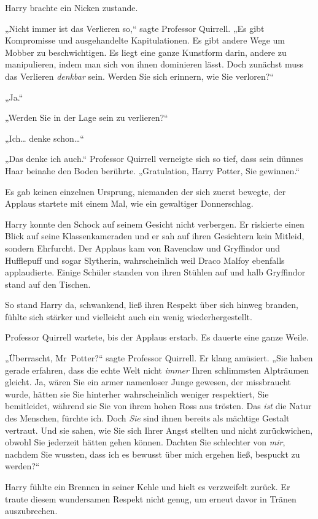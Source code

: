 {Harry brachte ein Nicken zustande.

„Nicht immer ist das Verlieren so,“ sagte Professor Quirrell. „Es gibt Kompromisse und ausgehandelte Kapitulationen. Es gibt andere Wege um Mobber zu beschwichtigen. Es liegt eine ganze Kunstform darin, andere zu manipulieren, indem man sich von ihnen dominieren lässt. Doch zunächst muss das Verlieren \emph{denkbar} sein. Werden Sie sich erinnern, wie Sie verloren?“

„Ja.“

„Werden Sie in der Lage sein zu verlieren?“

„Ich… denke schon…“

„Das denke ich auch.“ Professor Quirrell verneigte sich so tief, dass sein dünnes Haar beinahe den Boden berührte. „Gratulation, Harry Potter, Sie gewinnen.“

Es gab keinen einzelnen Ursprung, niemanden der sich zuerst bewegte, der Applaus startete mit einem Mal, wie ein gewaltiger Donnerschlag.

Harry konnte den Schock auf seinem Gesicht nicht verbergen. Er riskierte einen Blick auf seine Klassenkameraden und er sah auf ihren Gesichtern kein Mitleid, sondern Ehrfurcht. Der Applaus kam von Ravenclaw und Gryffindor und Hufflepuff und sogar Slytherin, wahrscheinlich weil Draco Malfoy ebenfalls applaudierte. Einige Schüler standen von ihren Stühlen auf und halb Gryffindor stand auf den Tischen.

So stand Harry da, schwankend, ließ ihren Respekt über sich hinweg branden, fühlte sich stärker und vielleicht auch ein wenig wiederhergestellt.

Professor Quirrell wartete, bis der Applaus erstarb. Es dauerte eine ganze Weile.

„Überrascht, Mr~Potter?“ sagte Professor Quirrell. Er klang amüsiert. „Sie haben gerade erfahren, dass die echte Welt nicht \emph{immer} Ihren schlimmsten Alpträumen gleicht. Ja, wären Sie ein armer namenloser Junge gewesen, der missbraucht wurde, hätten sie Sie hinterher wahrscheinlich weniger respektiert, Sie bemitleidet, während sie Sie von ihrem hohen Ross aus trösten. Das \emph{ist} die Natur des Menschen, fürchte ich. Doch \emph{Sie} sind ihnen bereits als mächtige Gestalt vertraut. Und sie sahen, wie Sie sich Ihrer Angst stellten und nicht zurückwichen, obwohl Sie jederzeit hätten gehen können. Dachten Sie schlechter von \emph{mir}, nachdem Sie wussten, dass ich es bewusst über mich ergehen ließ, bespuckt zu werden?“

Harry fühlte ein Brennen in seiner Kehle und hielt es verzweifelt zurück. Er traute diesem wundersamen Respekt nicht genug, um erneut davor in Tränen auszubrechen.

}
